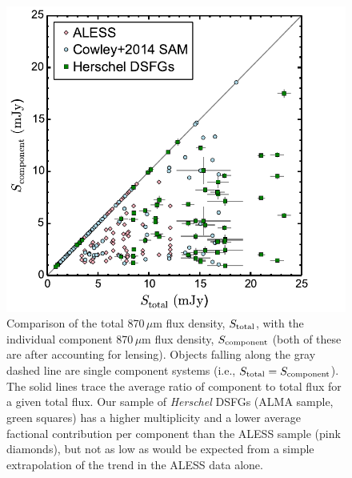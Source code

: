\documentclass[iop]{emulateapj}
\begin{document}
\begin{figure}[!tbp] 
\includegraphics[width=\linewidth]{../Figures/fluxtotalcomponent.pdf}

\caption{ Comparison of the total 870$\,\mu$m flux density, $S_{\rm total}$,
with the individual component 870$\,\mu$m flux density, $S_{\rm component}$
(both of these are after accounting for lensing).  Objects falling along the
gray dashed line are single component systems (i.e., $S_{\rm total} = S_{\rm
component}$).  The solid lines trace the average ratio of component to total
flux for a given total flux.  Our sample of {\it Herschel} DSFGs (ALMA sample,
green squares) has a higher multiplicity and a lower average factional
contribution per component than the ALESS sample (pink diamonds), but not as
low as would be expected from a simple extrapolation of the trend in the ALESS
data alone.} \label{fig:componentflux}

\end{figure}

\end{document}
